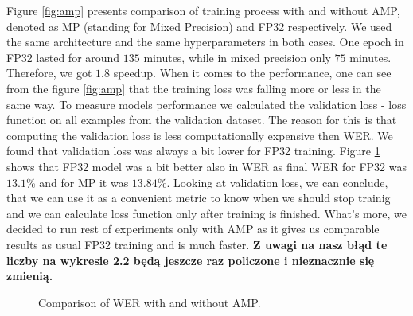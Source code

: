 \documentclass[licencjacka,en]{pracamgr}
\begin{document}
	Figure \ref{fig:amp} presents comparison of training process with and without AMP, denoted as MP (standing for Mixed Precision) and FP32 respectively. We used the same architecture and the same hyperparameters in both cases. One epoch in FP32 lasted for around $135$ minutes, while in mixed precision only $75$ minutes. Therefore, we got $1.8$ speedup. When it comes to the performance, one can see from the figure \ref{fig:amp} that the training loss was falling more or less in the same way. To measure models performance we calculated the validation loss - loss function on all examples from the validation dataset. The reason for this is that computing the validation loss is less computationally expensive then WER. We found that validation loss was always a bit lower for FP32 training. Figure \ref{fig:wer} shows that FP32 model was a bit better also in WER as final WER for FP32 was $13.1$\% and for MP it was $13.84$\%. Looking at validation loss, we can conclude, that we can use it as a convenient metric to know when we should stop trainig and we can calculate loss function only after training is finished. What's more, we decided to run rest of experiments only with AMP as it gives us comparable results as usual FP32 training and is much faster.
	\textbf{Z uwagi na nasz błąd te liczby na wykresie 2.2 będą jeszcze raz policzone i nieznacznie się zmienią.}
	
	\wercomp
	
	\begin{figure}[!hbt]
		\begin{center}
		\end{center}
		\caption{Comparison of WER with and without AMP.}
		\label{fig:wer}
	\end{figure}
\end{document}
